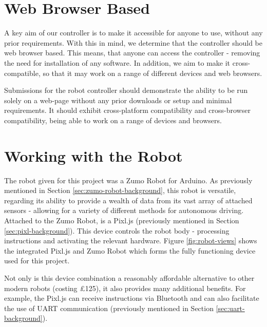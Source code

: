 \documentclass{l4proj}
\begin{document}
\section{Web Browser Based}\label{sec:web-browser-based}
A key aim of our controller is to make it accessible for anyone to use, without any prior requirements. With this in mind, we determine that the controller should be web browser based. This means, that anyone can access the controller - removing the need for installation of any software. In addition, we aim to make it cross-compatible, so that it may work on a range of different devices and web browsers.

Submissions for the robot controller should demonstrate the ability to be run solely on a web-page without any prior downloads or setup and minimal requirements. It should exhibit cross-platform compatibility and cross-browser compatibility, being able to work on a range of devices and browsers.

\section{Working with the Robot}\label{sec:working-with-robot}
The robot given for this project was a Zumo Robot for Arduino. As previously mentioned in Section \ref{sec:zumo-robot-background}, this robot is versatile, regarding its ability to provide a wealth of data from its vast array of attached sensors - allowing for a variety of different methods for autonomous driving. Attached to the Zumo Robot, is a Pixl.js (previously mentioned in Section \ref{sec:pixl-background}). This device controls the robot body - processing instructions and activating the relevant hardware. Figure \ref{fig:robot-views} shows the integrated Pixl.js and Zumo Robot which forms the fully functioning device used for this project.

Not only is this device combination a reasonably affordable alternative to other modern robots (costing £125), it also provides many additional benefits. For example, the Pixl.js can receive instructions via Bluetooth and can also facilitate the use of UART communication (previously mentioned in Section \ref{sec:uart-background}).
\end{document}
